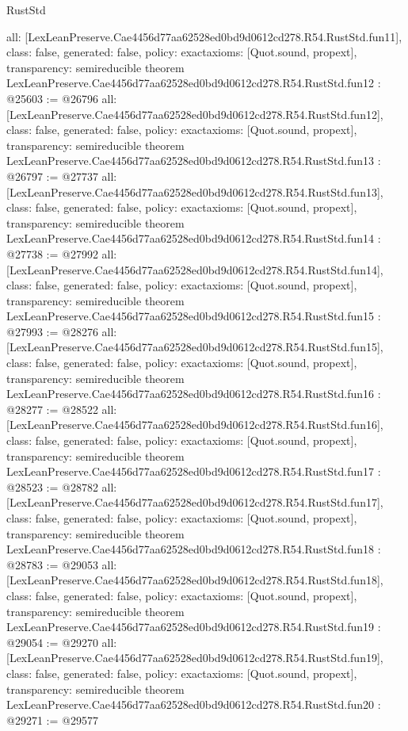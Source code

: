 \begin{lexlean}{RustStd}
\begin{coremodule}
{  all: [LexLeanPreserve.Cae4456d77aa62528ed0bd9d0612cd278.R54.RustStd.fun11],
  class: false,
  generated: false,
  policy: exact{axioms: [Quot.sound, propext]},
  transparency: semireducible
}
theorem LexLeanPreserve.Cae4456d77aa62528ed0bd9d0612cd278.R54.RustStd.fun12 : @25603 := @26796 {
  all: [LexLeanPreserve.Cae4456d77aa62528ed0bd9d0612cd278.R54.RustStd.fun12],
  class: false,
  generated: false,
  policy: exact{axioms: [Quot.sound, propext]},
  transparency: semireducible
}
theorem LexLeanPreserve.Cae4456d77aa62528ed0bd9d0612cd278.R54.RustStd.fun13 : @26797 := @27737 {
  all: [LexLeanPreserve.Cae4456d77aa62528ed0bd9d0612cd278.R54.RustStd.fun13],
  class: false,
  generated: false,
  policy: exact{axioms: [Quot.sound, propext]},
  transparency: semireducible
}
theorem LexLeanPreserve.Cae4456d77aa62528ed0bd9d0612cd278.R54.RustStd.fun14 : @27738 := @27992 {
  all: [LexLeanPreserve.Cae4456d77aa62528ed0bd9d0612cd278.R54.RustStd.fun14],
  class: false,
  generated: false,
  policy: exact{axioms: [Quot.sound, propext]},
  transparency: semireducible
}
theorem LexLeanPreserve.Cae4456d77aa62528ed0bd9d0612cd278.R54.RustStd.fun15 : @27993 := @28276 {
  all: [LexLeanPreserve.Cae4456d77aa62528ed0bd9d0612cd278.R54.RustStd.fun15],
  class: false,
  generated: false,
  policy: exact{axioms: [Quot.sound, propext]},
  transparency: semireducible
}
theorem LexLeanPreserve.Cae4456d77aa62528ed0bd9d0612cd278.R54.RustStd.fun16 : @28277 := @28522 {
  all: [LexLeanPreserve.Cae4456d77aa62528ed0bd9d0612cd278.R54.RustStd.fun16],
  class: false,
  generated: false,
  policy: exact{axioms: [Quot.sound, propext]},
  transparency: semireducible
}
theorem LexLeanPreserve.Cae4456d77aa62528ed0bd9d0612cd278.R54.RustStd.fun17 : @28523 := @28782 {
  all: [LexLeanPreserve.Cae4456d77aa62528ed0bd9d0612cd278.R54.RustStd.fun17],
  class: false,
  generated: false,
  policy: exact{axioms: [Quot.sound, propext]},
  transparency: semireducible
}
theorem LexLeanPreserve.Cae4456d77aa62528ed0bd9d0612cd278.R54.RustStd.fun18 : @28783 := @29053 {
  all: [LexLeanPreserve.Cae4456d77aa62528ed0bd9d0612cd278.R54.RustStd.fun18],
  class: false,
  generated: false,
  policy: exact{axioms: [Quot.sound, propext]},
  transparency: semireducible
}
theorem LexLeanPreserve.Cae4456d77aa62528ed0bd9d0612cd278.R54.RustStd.fun19 : @29054 := @29270 {
  all: [LexLeanPreserve.Cae4456d77aa62528ed0bd9d0612cd278.R54.RustStd.fun19],
  class: false,
  generated: false,
  policy: exact{axioms: [Quot.sound, propext]},
  transparency: semireducible
}
theorem LexLeanPreserve.Cae4456d77aa62528ed0bd9d0612cd278.R54.RustStd.fun20 : @29271 := @29577 {
}
\end{coremodule}
\end{lexlean}
